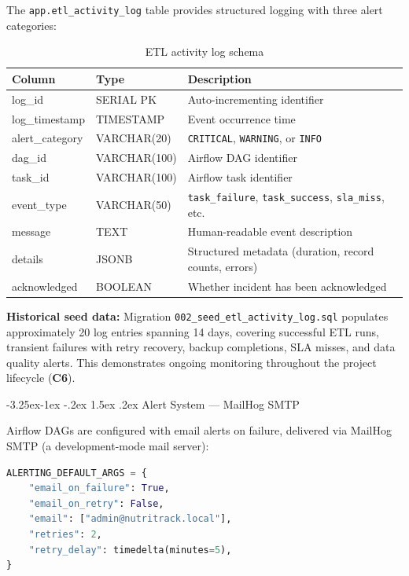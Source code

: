 \documentclass[a4paper,11pt,oneside,openany]{report}
\makeatletter
\renewcommand\subsection{\@startsection{subsection}{2}{\z@}%
  {-3.25ex\@plus -1ex \@minus -.2ex}%
  {1.5ex \@plus .2ex}%
  {\normalfont\large\bfseries\color{ntdarkgreen}}}
\newcommand{\competence}[1]{\textbf{\textcolor{ntgreen}{#1}}}
\makeatother
\begin{document}
The \texttt{app.etl\_activity\_log} table provides structured logging
with three alert categories:

\begin{table}[H]
\centering
\caption{ETL activity log schema}
\label{tab:activity-log}
\begin{tabularx}{\textwidth}{L{3cm} L{2.5cm} L{7cm}}
\toprule
\textbf{Column} & \textbf{Type} & \textbf{Description} \\
\midrule
log\_id & SERIAL PK & Auto-incrementing identifier \\
log\_timestamp & TIMESTAMP & Event occurrence time \\
alert\_category & VARCHAR(20) & \texttt{CRITICAL}, \texttt{WARNING}, or \texttt{INFO} \\
dag\_id & VARCHAR(100) & Airflow DAG identifier \\
task\_id & VARCHAR(100) & Airflow task identifier \\
event\_type & VARCHAR(50) & \texttt{task\_failure}, \texttt{task\_success}, \texttt{sla\_miss}, etc. \\
message & TEXT & Human-readable event description \\
details & JSONB & Structured metadata (duration, record counts, errors) \\
acknowledged & BOOLEAN & Whether incident has been acknowledged \\
\bottomrule
\end{tabularx}
\end{table}

\textbf{Historical seed data:} Migration \texttt{002\_seed\_etl\_activity\_log.sql}
populates approximately 20 log entries spanning 14 days, covering
successful ETL runs, transient failures with retry recovery, backup
completions, SLA misses, and data quality alerts. This demonstrates
ongoing monitoring throughout the project lifecycle (\competence{C6}).

\subsection{Alert System --- MailHog SMTP}

Airflow DAGs are configured with email alerts on failure, delivered via
MailHog SMTP (a development-mode mail server):

\begin{lstlisting}[language=Python, caption={Alerting default configuration (airflow/plugins/alerting.py)}]
ALERTING_DEFAULT_ARGS = {
    "email_on_failure": True,
    "email_on_retry": False,
    "email": ["admin@nutritrack.local"],
    "retries": 2,
    "retry_delay": timedelta(minutes=5),
}
\end{lstlisting}
\end{document}
